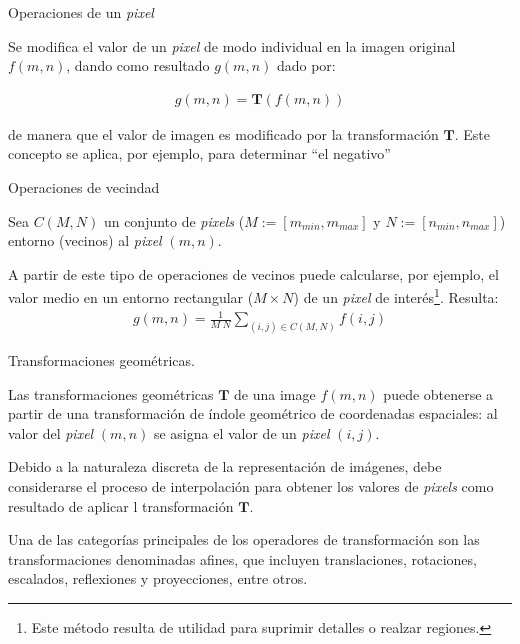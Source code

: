 \begin{center}
 Operaciones de un \textit{pixel}
\end{center}

Se modifica el valor de un \textit{pixel} de modo individual en la imagen original $f(m, n)$, dando como resultado $g(m, n)$ dado por:

\begin{eqnarray}
	g (m, n) = \mathbf{T} \left( f(m, n) \right)
\label{EqXLI}
\end{eqnarray}

de manera que el valor de imagen es modificado por la transformaci\'on $\mathbf{T}$. Este concepto se aplica, por ejemplo, para determinar ``el negativo''
\begin{center}
 Operaciones de vecindad
\end{center}

Sea $C (M, N)$ un conjunto de \textit{pixels} ($M := [m_{min}, m_{max}]$ y $N := [n_{min}, n_{max}]$) entorno (vecinos) al \textit{pixel} $(m, n)$.
%

%
A partir de este tipo de operaciones de vecinos puede calcularse, por ejemplo, el valor medio en un entorno rectangular ($M \times N$) de un \textit{pixel} 
de inter\'es\footnote{Este m\'etodo resulta de utilidad para suprimir detalles o realzar regiones.}. Resulta:
%
\begin{eqnarray}
	g (m, n) = \frac{1}{ M \; N} \sum _{(i, j) \in C(M, N)} f(i, j)
\label{EqXLII}
\end{eqnarray}


\begin{center}
 Transformaciones geom\'etricas.
\end{center}

Las transformaciones geom\'etricas $\mathbf{T}$ de una image $f(m, n)$ puede obtenerse a partir de una transformaci\'on de \'indole geom\'etrico 
de coordenadas espaciales: al valor del \textit{pixel} $(m, n)$ se asigna el valor de un \textit{pixel} $(i, j)$.
%

%
Debido a la naturaleza discreta de la representaci\'on de im\'agenes, debe considerarse el proceso de interpolaci\'on para obtener los valores de 
\textit{pixels} como resultado de aplicar l transformaci\'on $\mathbf{T}$.
%

%
Una de las categor\'ias principales de los operadores de transformaci\'on son las transformaciones denominadas afines, que incluyen translaciones, 
rotaciones, escalados, reflexiones y proyecciones, entre otros.
%


